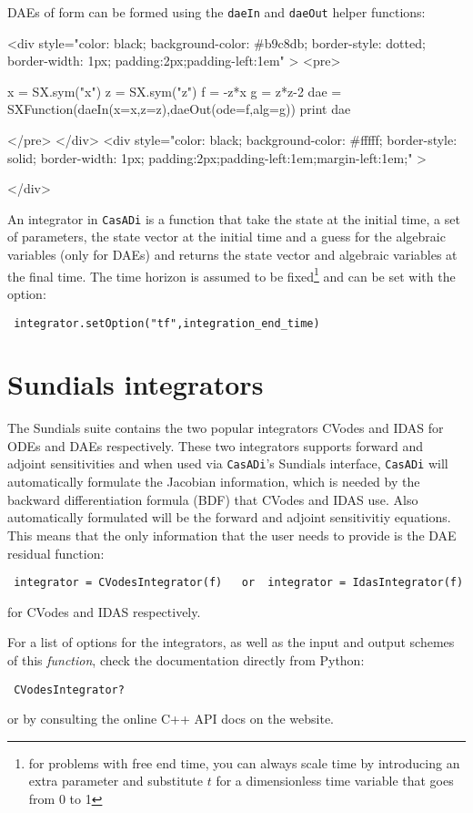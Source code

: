 \documentclass[a4paper,12pt]{book}
\newcommand{\CasADi}{\texttt{CasADi}\xspace}
\newcounter{pytexcount}
\newcounter{pytexsubcount}
\renewenvironment{pytex}
{\addtocounter{pytexsubcount}{1}%
\begin{rawhtml}
<div style="color: black; background-color: \#b9c8db;  border-style: dotted; border-width: 1px; padding:2px;padding-left:1em" >
<pre>
\end{rawhtml}
}%
{\begin{rawhtml}
</pre>
</div>
<div style="color: black; background-color: \#fffff;  border-style: solid; border-width: 1px; padding:2px;padding-left:1em;margin-left:1em;" >\end{rawhtml}%
\verbatiminputeval{pytex_\alph{pytexcount}_\arabic{pytexsubcount}.log}%
\begin{rawhtml}
</div>
\end{rawhtml}
}
\begin{document}
DAEs of form can be formed using the \verb|daeIn| and \verb|daeOut| helper functions:

\begin{pytex}
x = SX.sym("x")
z = SX.sym("z")
f = -z*x
g = z*z-2
dae = SXFunction(daeIn(x=x,z=z),daeOut(ode=f,alg=g))
print dae
\end{pytex}


An integrator in \CasADi is a function that take the state at the initial time, a set of parameters, the state vector at the initial time and a guess for the algebraic variables (only for DAEs) and returns the state vector and algebraic variables at the final time. The time horizon is assumed to be fixed\footnote{for problems with free end time, you can always scale time by introducing an extra parameter and substitute $t$ for a dimensionless time variable that goes from 0 to 1} and can be set with the option:
\begin{verbatim}
 integrator.setOption("tf",integration_end_time)
\end{verbatim}

\section{Sundials integrators}
The Sundials suite contains the two popular integrators CVodes and IDAS for ODEs and DAEs respectively. These two integrators supports forward and adjoint sensitivities and when used via \CasADi's Sundials interface, \CasADi will automatically formulate the Jacobian information, which is needed by the backward differentiation formula (BDF) that CVodes and IDAS use. Also automatically formulated will be the forward and adjoint sensitivitiy equations. This means that the only information that the user needs to provide is the DAE residual function:
\begin{verbatim}
 integrator = CVodesIntegrator(f)   or  integrator = IdasIntegrator(f)
\end{verbatim}
for CVodes and IDAS respectively.

For a list of options for the integrators, as well as the input and output schemes of this \emph{function}, check the documentation directly from Python:
\begin{verbatim}
 CVodesIntegrator?
\end{verbatim}
or by consulting the online C++ API docs on the website.
\end{document}
